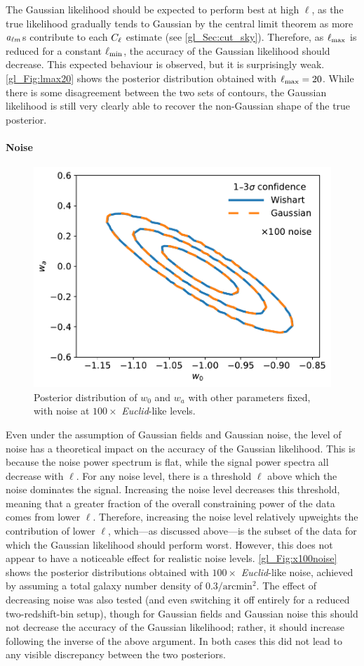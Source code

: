 The Gaussian likelihood should be expected to perform best at high $\ell$, as the true likelihood gradually tends to Gaussian by the central limit theorem as more $a_{\ell m}$s contribute to each $C_\ell$ estimate (see \autoref{gl_Sec:cut_sky}). Therefore, as $\ell_\text{max}$ is reduced for a constant $\ell_\text{min}$, the accuracy of the Gaussian likelihood should decrease. This expected behaviour is observed, but it is surprisingly weak. \autoref{gl_Fig:lmax20} shows the posterior distribution obtained with $\ell_\text{max} = 20$. While there is some disagreement between the two sets of contours, the Gaussian likelihood is still very clearly able to recover the non-Gaussian shape of the true posterior.

\paragraph*{Noise}

\begin{figure}
\centering
\includegraphics[width=.5\textwidth]{x100noise}
\caption{Posterior distribution of $w_0$ and $w_a$ with other parameters fixed, with noise at $100 \times$ \textit{Euclid}-like levels.}
\label{gl_Fig:x100noise}
\end{figure}

Even under the assumption of Gaussian fields and Gaussian noise, the level of noise has a theoretical impact on the accuracy of the Gaussian likelihood. This is because the noise power spectrum is flat, while the signal power spectra all decrease with $\ell$. For any noise level, there is a threshold $\ell$ above which the noise dominates the signal. Increasing the noise level decreases this threshold, meaning that a greater fraction of the overall constraining power of the data comes from lower $\ell$. Therefore, increasing the noise level relatively upweights the contribution of lower $\ell$, which---as discussed above---is the subset of the data for which the Gaussian likelihood should perform worst. However, this does not appear to have a noticeable effect for realistic noise levels. \autoref{gl_Fig:x100noise} shows the posterior distributions obtained with $100 \times$ \textit{Euclid}-like noise, achieved by assuming a total galaxy number density of $0.3 / \text{arcmin}^2$.
The effect of decreasing noise was also tested (and even switching it off entirely for a reduced two-redshift-bin setup), though for Gaussian fields and Gaussian noise this should not decrease the accuracy of the Gaussian likelihood; rather, it should increase following the inverse of the above argument. In both cases this did not lead to any visible discrepancy between the two posteriors.


